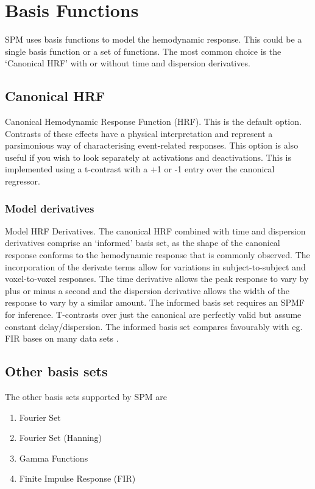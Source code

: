 \documentclass[a4paper,titlepage]{book}
\begin{document}
\section{Basis Functions}

SPM uses basis functions to model the hemodynamic response. This could 
be a single basis function or a set of functions.
The most common choice is the `Canonical HRF' with or without time and dispersion derivatives. 


\subsection{Canonical HRF}
Canonical Hemodynamic Response Function (HRF). This is the default option. Contrasts of these effects have a physical interpretation and represent a parsimonious way of characterising event-related responses. This option is also useful if you wish to look separately at activations and deactivations. This is implemented using a t-contrast with a +1 or -1 entry over the canonical regressor. 


\subsubsection{Model derivatives}
Model HRF Derivatives. The canonical HRF combined with time and dispersion derivatives comprise an `informed' basis set, as the shape of the canonical response conforms to the hemodynamic response that is commonly observed. The incorporation of the derivate terms allow for variations in subject-to-subject and voxel-to-voxel responses. The time derivative allows the peak response to vary by plus or minus a second and the dispersion derivative allows the width of the response to vary by a 
similar amount. The informed basis set requires an SPM{F} for inference. T-contrasts over just the canonical are perfectly valid but assume constant delay/dispersion. The informed basis set compares favourably with eg. FIR bases on many data sets \cite{rnah_basis}.

\subsection{Other basis sets}

The other basis sets supported by SPM are
\begin{enumerate}

\item{Fourier Set}
\item{Fourier Set (Hanning)}
\item{Gamma Functions}
\item{Finite Impulse Response (FIR)}
\end{enumerate}
\end{document}
